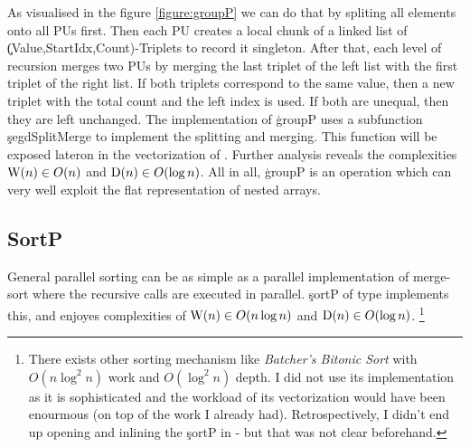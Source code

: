     As visualised in the figure \ref{figure:groupP}
    we can do that by spliting all elements onto all PUs first.
    Then each PU creates a local chunk of a linked list of
    \c{(Value,StartIdx,Count)}-Triplets to record it singleton.
    After that, each level of recursion merges two PUs by
    merging the last triplet of the left list with the first triplet
    of the right list. If both triplets correspond to the same value,
    then a new triplet with the total count and the left index is used.
    If both are unequal, then they are left unchanged. The implementation
    of \c{groupP} uses a subfunction \c{segdSplitMerge} to implement the
    splitting and merging. This function will be exposed lateron in
    the vectorization of \ndpn.
    Further analysis reveals the complexities $\textrm{W}(n) \in O(n)$ and $\textrm{D}(n) \in O(\log n)$.
    All in all, \c{groupP} is an operation which can very well exploit the flat representation of nested arrays.
    
  \subsection{SortP}
    General parallel sorting can be as simple as a parallel
    implementation of merge-sort where the recursive calls are executed
    in parallel. \c{sortP} of type \type{[:Int:] -> [:Int:]} implements this,
    and enjoyes complexities of $\textrm{W}(n) \in O(n \log n)$
    and $\textrm{D}(n) \in O(\log n)$.
    \footnote{There exists other sorting mechanism
    like \emph{Batcher's Bitonic Sort} with $O(n \log^2 n)$ work and $O(\log^2 n)$
    depth. I did not use its implementation as it is sophisticated and
    the workload of its vectorization would have been enourmous (on top of the work I already had).
    Retrospectively, I didn't end up opening and inlining the \c{sortP} in \ndpv - but that
    was not clear beforehand.
    }

